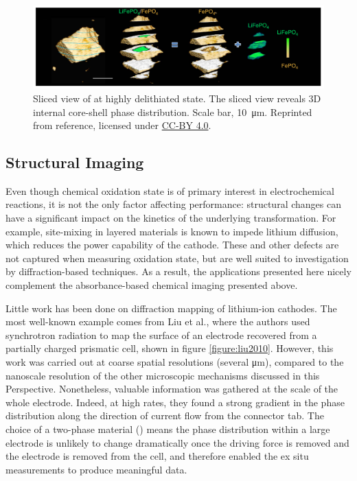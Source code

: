\documentclass[journal=cmatex,manuscript=perspective]{achemso}
\begin{document}
\begin{figure}
  \includegraphics[width=\textwidth]{wang2016.png}
  \caption{Sliced view of  at highly delithiated
    state. The sliced view reveals 3D internal core-shell phase
    distribution. Scale bar, \SI{10}{\micro\metre}. Reprinted from
    reference\cite{wang2016}, licensed under
    \href{https://creativecommons.org/licenses/by/4.0/}{CC-BY 4.0}.}
  \label{figure:wang2016}
\end{figure}


\subsection{Structural Imaging}

Even though chemical oxidation state is of primary interest in
electrochemical reactions, it is not the only factor affecting
performance: structural changes can have a significant impact on the
kinetics of the underlying transformation. For example, site-mixing in
layered materials is known to impede lithium diffusion\cite{xu2016-2},
which reduces the power capability of the cathode. These and other
defects are not captured when measuring oxidation state, but are well
suited to investigation by diffraction-based techniques. As a result,
the applications presented here nicely complement the absorbance-based
chemical imaging presented above.

Little work has been done on diffraction mapping of lithium-ion
cathodes. The most well-known example comes from Liu et
al.\cite{liu2010}, where the authors used synchrotron radiation to map
the surface of an electrode recovered from a partially charged
prismatic cell, shown in figure \ref{figure:liu2010}. However, this
work was carried out at coarse spatial resolutions (several
\si{\micro\meter}), compared to the nanoscale resolution of the other
microscopic mechanisms discussed in this Perspective. Nonetheless,
valuable information was gathered at the scale of the whole
electrode. Indeed, at high rates, they found a strong gradient in the
phase distribution along the direction of current flow from the
connector tab. The choice of a two-phase material () means
the phase distribution within a large electrode is unlikely to change
dramatically once the driving force is removed and the electrode is
removed from the cell, and therefore enabled the ex situ measurements
to produce meaningful data.
\end{document}
